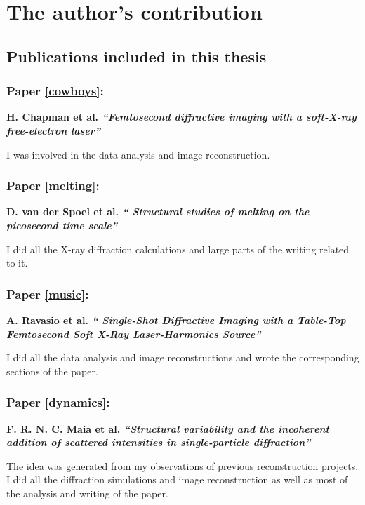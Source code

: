 \chapter{The author's contribution}

\section*{Publications included in this thesis}

\vspace{1cm}

\subsection*{Paper \ref{cowboys}:}{\bf H. Chapman et al. \noindent
{\em ``Femtosecond diffractive imaging with a soft-X-ray free-electron laser''}}

\noindent
I was involved in the data analysis and image reconstruction.

\noindent
\subsection*{Paper \ref{melting}:}{\bf D. van der Spoel et al. {\em ``
 Structural studies of melting on the picosecond time scale''}}

\noindent I did all the X-ray diffraction calculations and large parts of
the writing related to it.

\noindent
\subsection*{Paper \ref{music}:}{\bf A. Ravasio et al. {\em `` 
Single-Shot Diffractive Imaging with a Table-Top
      Femtosecond Soft X-Ray Laser-Harmonics Source''}}

\noindent I did all the data analysis and  image reconstructions and wrote the corresponding sections of the paper.

\noindent
\subsection*{Paper \ref{dynamics}:}{\bf F. R. N. C. Maia et al. {\em ``Structural variability and the incoherent addition of scattered
      intensities in single-particle diffraction''}}

\noindent The idea was generated from my observations of previous reconstruction
projects. I did all the diffraction simulations and image reconstruction as well
as most of the analysis and writing of the paper.

